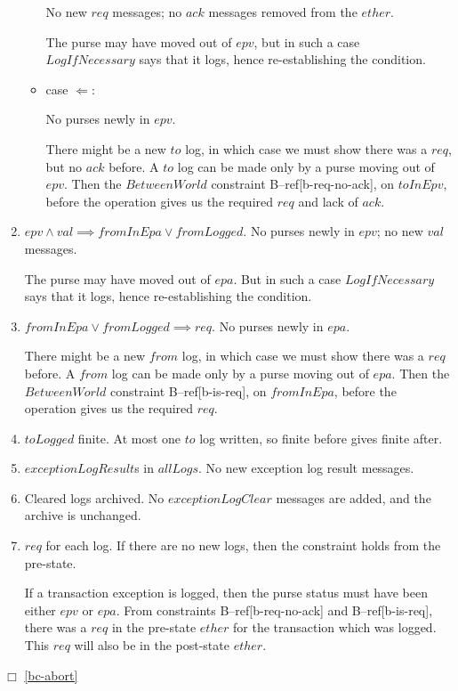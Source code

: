 \begin{enumerate}
\begin{itemize}
    No new $req$ messages; no $ack$ messages removed from the $ether$.

    The purse may have moved out of $epv$, but in such a case
    $LogIfNecessary$ says that it logs, hence re-establishing the
    condition.

  \item case $\Leftarrow$:

    No purses newly in $epv$.

    There might be a new $to$ log, in which case we must show there
    was a $req$, but no $ack$ before.  A $to$ log can be made only by
    a purse moving out of $epv$.  Then the $BetweenWorld$ constraint
    B--ref[b-req-no-ack], on $toInEpv$, before the operation gives us
    the required $req$ and lack of $ack$.
  \end{itemize}
\item $epv \land val \implies fromInEpa \lor fromLogged$.  No purses
  newly in $epv$; no new $val$ messages.

  The purse may have moved out of $epa$.  But in such a case
  $LogIfNecessary$ says that it logs, hence re-establishing the
  condition.
\item $fromInEpa \lor fromLogged \implies req$.  No purses newly in
  $epa$.

  There might be a new $from$ log, in which case we must show there
  was a $req$ before.  A $from$ log can be made only by a purse moving
  out of $epa$.  Then the $BetweenWorld$ constraint B--ref[b-is-req],
  on $fromInEpa$, before the operation gives us the required $req$.
\item $toLogged$ finite.  At most one $to$ log written, so finite
  before gives finite after.
\item $exceptionLogResult$s in $allLogs$.  No new exception log result
  messages.
\item Cleared logs archived.  No $exceptionLogClear$ messages are
  added, and the archive is unchanged.
\item $req$ for each log.  If there are no new logs, then the
  constraint holds from the pre-state.

  If a transaction exception is logged, then the purse status must
  have been either $epv$ or $epa$.  From constraints
  B--ref[b-req-no-ack] and B--ref[b-is-req], there was a $req$ in
  the pre-state $ether$ for the transaction which was logged.  This
  $req$ will also be in the post-state $ether$.
\end{enumerate}

$\Box$ \ref{bc-abort}

